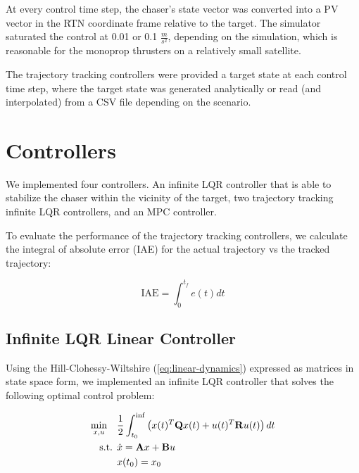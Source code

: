 \documentclass[conference]{IEEEtran}
\begin{document}
At every control time step, the chaser's state vector was converted into a PV
vector in the RTN coordinate frame relative to the target. The simulator
saturated the control at 0.01  or 0.1 $\frac{m}{s^2}$, depending on the
simulation, which is reasonable for the monoprop thrusters on a relatively
small satellite.

The trajectory tracking controllers were provided a target state at each
control time step, where the target state was generated analytically or read
(and interpolated) from a CSV file depending on the scenario.


\section{Controllers}

We implemented four controllers. An infinite LQR controller that is able to
stabilize the chaser within the vicinity of the target, two trajectory tracking
infinite LQR controllers, and an MPC controller.

To evaluate the performance of the trajectory tracking controllers, we
calculate the integral of absolute error (IAE) for the actual trajectory vs the
tracked trajectory:

\begin{equation}
    \text{IAE} = \int_0^{t_f} e(t) dt
\end{equation}


\subsection{Infinite LQR Linear Controller}

Using the Hill-Clohessy-Wiltshire (\ref{eq:linear-dynamics})
expressed as matrices in state space form, we
implemented an infinite LQR controller that solves the following optimal
control problem:

\begin{equation}
    \label{eq:linear-infinite-lqr}
    \begin{split}
        \min_{x, u} \ \ \  & \frac{1}{2} \int_{t_0}^{\inf} \left( x(t)^T {\bf Q}
            x(t) + u(t)^T {\bf R} u(t) \right)dt \\
        \text{s.t.   } & \dot{x} = {\bf{A}}x + {\bf B}u \\
                     & x(t_0) = x_0
    \end{split}
\end{equation}
\end{document}
